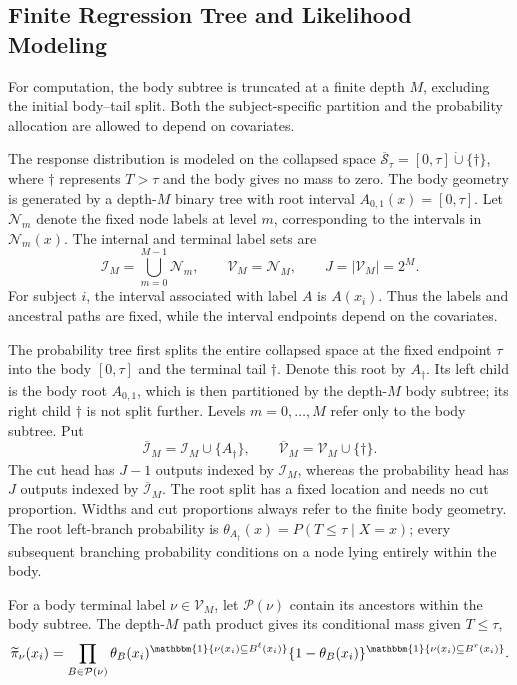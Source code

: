 \documentclass[11pt]{article}
\numberwithin{equation}{section}
\begin{document}
\subsection{Finite Regression Tree and Likelihood Modeling}
\label{section-FNRT}
For computation, the body subtree is truncated at a finite depth $M$, excluding the initial body--tail split. Both the subject-specific partition and the probability allocation are allowed to depend on covariates.

The response distribution is modeled on the collapsed space $\overline{\mathcal S}_\tau=[0,\tau]\mathbin{\dot\cup}\{\dagger\}$, where $\dagger$ represents $T>\tau$ and the body gives no mass to zero. The body geometry is generated by a depth-$M$ binary tree with root interval $A_{0,1}(x)=[0,\tau]$. Let $\mathcal N_m$ denote the fixed node labels at level $m$, corresponding to the intervals in $\mathcal N_m(x)$. The internal and terminal label sets are
\[
    \mathcal I_M=\bigcup_{m=0}^{M-1}\mathcal N_m,
    \qquad \mathcal V_M=\mathcal N_M,
    \qquad J=|\mathcal V_M|=2^M.
\]
For subject $i$, the interval associated with label $A$ is $A(x_i)$. Thus the labels and ancestral paths are fixed, while the interval endpoints depend on the covariates.

The probability tree first splits the entire collapsed space at the fixed endpoint $\tau$ into the body $[0,\tau]$ and the terminal tail $\dagger$. Denote this root by $A_\dagger$. Its left child is the body root $A_{0,1}$, which is then partitioned by the depth-$M$ body subtree; its right child $\dagger$ is not split further. Levels $m=0,\ldots,M$ refer only to the body subtree. Put
\[
    \overline{\mathcal I}_M=\mathcal I_M\cup\{A_\dagger\},
    \qquad \overline{\mathcal V}_M=\mathcal V_M\cup\{\dagger\}.
\]
The cut head has $J-1$ outputs indexed by $\mathcal I_M$, whereas the probability head has $J$ outputs indexed by $\overline{\mathcal I}_M$. The root split has a fixed location and needs no cut proportion. Widths and cut proportions always refer to the finite body geometry. The root left-branch probability is $\theta_{A_\dagger}(x)=P(T\leq\tau\mid X=x)$; every subsequent branching probability conditions on a node lying entirely within the body.

For a body terminal label $\nu\in\mathcal V_M$, let $\mathcal P(\nu)$ contain its ancestors within the body subtree. The depth-$M$ path product gives its conditional mass given $T\leq\tau$,
$$
    \widetilde\pi_\nu(x_i)
    =
    \prod_{B\in \mathcal{P}(\nu)}
    \theta_B(x_i)^{\mathbbm{1}\{\nu(x_i)\subseteq B^\ell(x_i)\}}
    \{1-\theta_B(x_i)\}^{\mathbbm{1}\{\nu(x_i)\subseteq B^r(x_i)\}}.
$$
\end{document}
